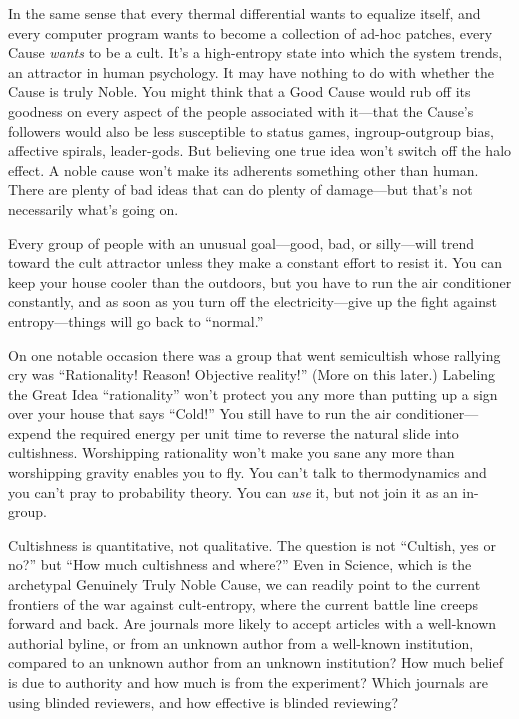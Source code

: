 {
 In the same sense that every thermal differential wants to
equalize itself, and every computer program wants to become a
collection of ad-hoc patches, every Cause \textit{wants} to be a cult.
It's a high-entropy state into which the system trends,
an attractor in human psychology. It may have nothing to do with
whether the Cause is truly Noble. You might think that a Good Cause
would rub off its goodness on every aspect of the people associated
with it---that the Cause's followers would also be less
susceptible to status games, ingroup-outgroup bias, affective spirals,
leader-gods. But believing one true idea won't switch
off the halo effect. A noble cause won't make its
adherents something other than human. There are plenty of bad ideas
that can do plenty of damage---but that's not
necessarily what's going on.}

{
 Every group of people with an unusual goal---good, bad, or
silly---will trend toward the cult attractor unless they make a
constant effort to resist it. You can keep your house cooler than the
outdoors, but you have to run the air conditioner constantly, and as
soon as you turn off the electricity---give up the fight against
entropy---things will go back to
``normal.''}

{
 On one notable occasion there was a group that went semicultish
whose rallying cry was ``Rationality! Reason!
Objective reality!'' (More on this later.) Labeling
the Great Idea ``rationality''
won't protect you any more than putting up a sign over
your house that says ``Cold!'' You
still have to run the air conditioner---expend the required energy per
unit time to reverse the natural slide into cultishness. Worshipping
rationality won't make you sane any more than
worshipping gravity enables you to fly. You can't talk
to thermodynamics and you can't pray to probability
theory. You can \textit{use} it, but not join it as an in-group.}

{
 Cultishness is quantitative, not qualitative. The question is not
``Cultish, yes or no?'' but
``How much cultishness and where?''
Even in Science, which is the archetypal Genuinely Truly Noble Cause,
we can readily point to the current frontiers of the war against
cult-entropy, where the current battle line creeps forward and back.
Are journals more likely to accept articles with a well-known authorial
byline, or from an unknown author from a well-known institution,
compared to an unknown author from an unknown institution? How much
belief is due to authority and how much is from the experiment? Which
journals are using blinded reviewers, and how effective is blinded
reviewing?}

